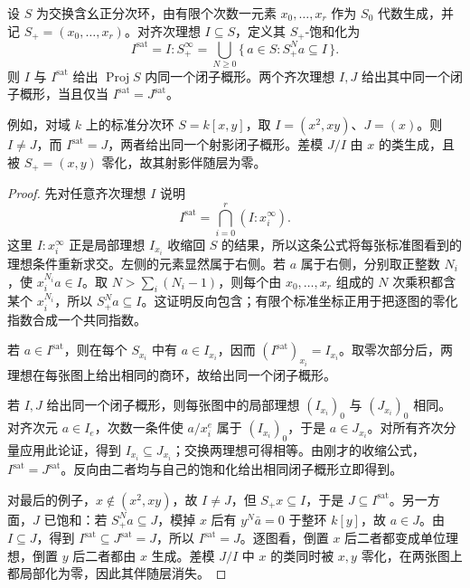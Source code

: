 \begin{proposition}[射影闭子概形与饱和化]\label{b3:prop:proj-saturation-standard}\label{b3:prop:proj-saturation-example}
	设 \(S\) 为交换含幺正分次环，由有限个次数一元素 \(x_0,\ldots,x_r\) 作为 \(S_0\) 代数生成，并记 \(S_+=(x_0,\ldots,x_r)\)。对齐次理想 \(I\subseteq S\)，定义其 \(S_+\)-饱和化为
	\[
		I^{\mathrm{sat}}=I:S_+^\infty =\bigcup_{N\ge0}\{\,a\in S:S_+^Na\subseteq I\,\}.
	\]
	则 \(I\) 与 \(I^{\mathrm{sat}}\) 给出 \(\operatorname{Proj}S\) 内同一个闭子概形。两个齐次理想 \(I,J\) 给出其中同一个闭子概形，当且仅当 \(I^{\mathrm{sat}}=J^{\mathrm{sat}}\)。

	例如，对域 \(k\) 上的标准分次环 \(S=k[x,y]\)，取 \(I=(x^2,xy)\)、\(J=(x)\)。则 \(I\ne J\)，而 \(I^{\mathrm{sat}}=J\)，两者给出同一个射影闭子概形。差模 \(J/I\) 由 \(x\) 的类生成，且被 \(S_+=(x,y)\) 零化，故其射影伴随层为零。
\end{proposition}
\begin{proof}
	先对任意齐次理想 \(I\) 说明
	\[
		I^{\mathrm{sat}} =\bigcap_{i=0}^r(I:x_i^\infty).
	\]
	这里 \(I:x_i^\infty\) 正是局部理想 \(I_{x_i}\) 收缩回 \(S\) 的结果，所以这条公式将每张标准图看到的理想条件重新求交。左侧的元素显然属于右侧。若 \(a\) 属于右侧，分别取正整数 \(N_i\)，使 \(x_i^{N_i}a\in I\)。取 \(N>\sum_i(N_i-1)\)，则每个由 \(x_0,\ldots,x_r\) 组成的 \(N\) 次乘积都含某个 \(x_i^{N_i}\)，所以 \(S_+^Na\subseteq I\)。这证明反向包含；有限个标准坐标正用于把逐图的零化指数合成一个共同指数。

	若 \(a\in I^{\mathrm{sat}}\)，则在每个 \(S_{x_i}\) 中有 \(a\in I_{x_i}\)，因而 \((I^{\mathrm{sat}})_{x_i}=I_{x_i}\)。取零次部分后，两理想在每张图上给出相同的商环，故给出同一个闭子概形。

	若 \(I,J\) 给出同一个闭子概形，则每张图中的局部理想 \((I_{x_i})_0\) 与 \((J_{x_i})_0\) 相同。对齐次元 \(a\in I_e\)，次数一条件使 \(a/x_i^e\) 属于 \((I_{x_i})_0\)，于是 \(a\in J_{x_i}\)。对所有齐次分量应用此论证，得到 \(I_{x_i}\subseteq J_{x_i}\)；交换两理想可得相等。由刚才的收缩公式，\(I^{\mathrm{sat}}=J^{\mathrm{sat}}\)。反向由二者均与自己的饱和化给出相同闭子概形立即得到。

	对最后的例子，\(x\notin(x^2,xy)\)，故 \(I\ne J\)，但 \(S_+x\subseteq I\)，于是 \(J\subseteq I^{\mathrm{sat}}\)。另一方面，\(J\) 已饱和：若 \(S_+^Na\subseteq J\)，模掉 \(x\) 后有 \(y^N\bar a=0\) 于整环 \(k[y]\)，故 \(a\in J\)。由 \(I\subseteq J\)，得到 \(I^{\mathrm{sat}}\subseteq J^{\mathrm{sat}}=J\)，所以 \(I^{\mathrm{sat}}=J\)。逐图看，倒置 \(x\) 后二者都变成单位理想，倒置 \(y\) 后二者都由 \(x\) 生成。差模 \(J/I\) 中 \(x\) 的类同时被 \(x,y\) 零化，在两张图上都局部化为零，因此其伴随层消失。
\end{proof}

